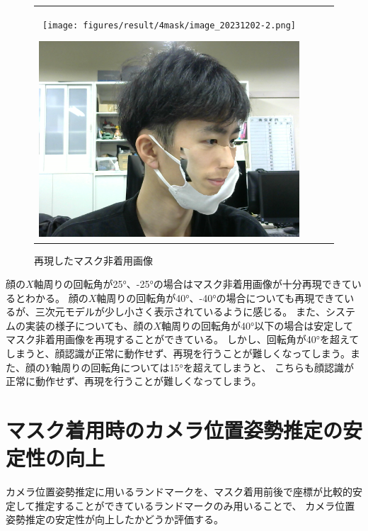 \documentclass[]{jarticle}          %
\begin{document}
\begin{figure}[!ht]
\begin{tabular}{cccc}
\begin{minipage}[t]{0.25\hsize}
      \caption{40°}
    \end{minipage}
    \begin{minipage}[t]{0.25\hsize}
      \centering
      \texttt{[image: figures/result/4mask/image\_20231202-2.png]}
      \caption{-25°}
    \end{minipage}
    \begin{minipage}[t]{0.25\hsize}
      \centering
      \includegraphics[keepaspectratio, scale=0.2]{figures/result/7mask/image_20231202-2.png}
      \caption{40°}
    \end{minipage}
  \end{tabular}
  \caption{再現したマスク非着用画像}
  \label{n432}
\end{figure}

顔の$X$軸周りの回転角が25°、-25°の場合はマスク非着用画像が十分再現できているとわかる。
顔の$X$軸周りの回転角が40°、-40°の場合についても再現できているが、三次元モデルが少し小さく表示されているように感じる。
また、システムの実装の様子についても、顔の$X$軸周りの回転角が40°以下の場合は安定してマスク非着用画像を再現することができている。
しかし、回転角が40°を超えてしまうと、顔認識が正常に動作せず、再現を行うことが難しくなってしまう。また、顔の$Y$軸周りの回転角については15°を超えてしまうと、
こちらも顔認識が正常に動作せず、再現を行うことが難しくなってしまう。

\section{マスク着用時のカメラ位置姿勢推定の安定性の向上}
カメラ位置姿勢推定に用いるランドマークを、マスク着用前後で座標が比較的安定して推定することができているランドマークのみ用いることで、
カメラ位置姿勢推定の安定性が向上したかどうか評価する。
\end{document}
